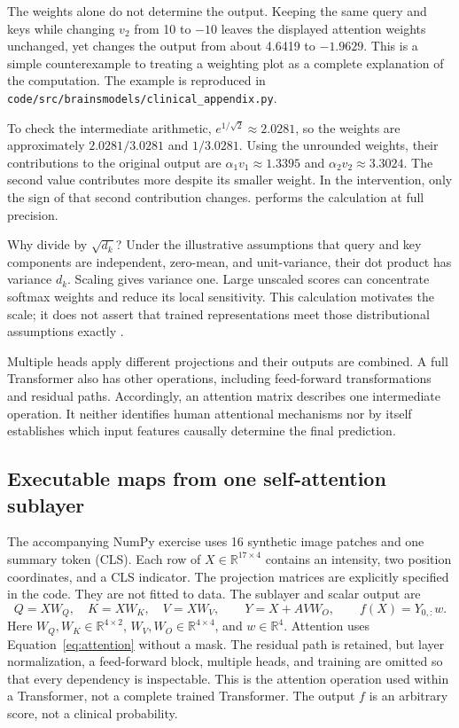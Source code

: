 The weights alone do not determine the output. Keeping the same query and keys while changing $v_2$ from 10 to $-10$ leaves the displayed attention weights unchanged, yet changes the output from about 4.6419 to $-1.9629$. This is a simple counterexample to treating a weighting plot as a complete explanation of the computation. The example is reproduced in \texttt{code/src/brainsmodels/clinical\_appendix.py}.

To check the intermediate arithmetic, $e^{1/\sqrt{2}}\approx2.0281$, so the weights are approximately $2.0281/3.0281$ and $1/3.0281$. Using the unrounded weights, their contributions to the original output are $\alpha_1v_1\approx1.3395$ and $\alpha_2v_2\approx3.3024$. The second value contributes more despite its smaller weight. In the intervention, only the sign of that second contribution changes.  performs the calculation at full precision.

Why divide by $\sqrt{d_k}$? Under the illustrative assumptions that query and key components are independent, zero-mean, and unit-variance, their dot product has variance $d_k$. Scaling gives variance one. Large unscaled scores can concentrate softmax weights and reduce its local sensitivity. This calculation motivates the scale; it does not assert that trained representations meet those distributional assumptions exactly \citep{vaswani2017}.

Multiple heads apply different projections and their outputs are combined. A full Transformer also has other operations, including feed-forward transformations and residual paths. Accordingly, an attention matrix describes one intermediate operation. It neither identifies human attentional mechanisms nor by itself establishes which input features causally determine the final prediction.

\subsection{Executable maps from one self-attention sublayer}\label{app:maps}
The accompanying NumPy exercise uses 16 synthetic image patches and one summary token (CLS). Each row of $X\in\mathbb{R}^{17\times4}$ contains an intensity, two position coordinates, and a CLS indicator. The projection matrices are explicitly specified in the code. They are not fitted to data. The sublayer and scalar output are
\[
Q=XW_Q,\quad K=XW_K,\quad V=XW_V,\qquad
Y=X+AVW_O,\qquad f(X)=Y_{0,:}w.
\]
Here $W_Q,W_K\in\mathbb{R}^{4\times2}$, $W_V,W_O\in\mathbb{R}^{4\times4}$, and $w\in\mathbb{R}^{4}$. Attention uses Equation~\ref{eq:attention} without a mask. The residual path is retained, but layer normalization, a feed-forward block, multiple heads, and training are omitted so that every dependency is inspectable. This is the attention operation used within a Transformer, not a complete trained Transformer. The output $f$ is an arbitrary score, not a clinical probability.


